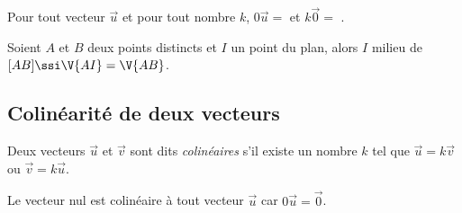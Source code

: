 \begin{prop}
Pour tout vecteur $\vec{u}$ et pour tout nombre $k$, $0\vec{u}=$ \dotfill et $k\vec{0}=$ \dotfill.
\end{prop}

\begin{prop}
Soient $A$ et $B$ deux points distincts et $I$ un point du plan, alors $I$ milieu de $[AB] \ssi \V{AI} = \dotfill \V{AB}$.
\end{prop}


\subsection{Colin\'earit\'e de deux vecteurs}

\begin{definition}
 Deux vecteurs $\vec{u}$ et $\vec{v}$ sont dits \emph{colin\'eaires} s'il existe un nombre $k$ tel que $\vec{u}=k\vec{v}$ ou $\vec{v}=k\vec{u}$.
\end{definition}

\begin{rmq}
 Le vecteur nul est colin\'eaire \`a tout vecteur $\vec{u}$ car $0\vec{u}=\vec{0}$.
\end{rmq}

